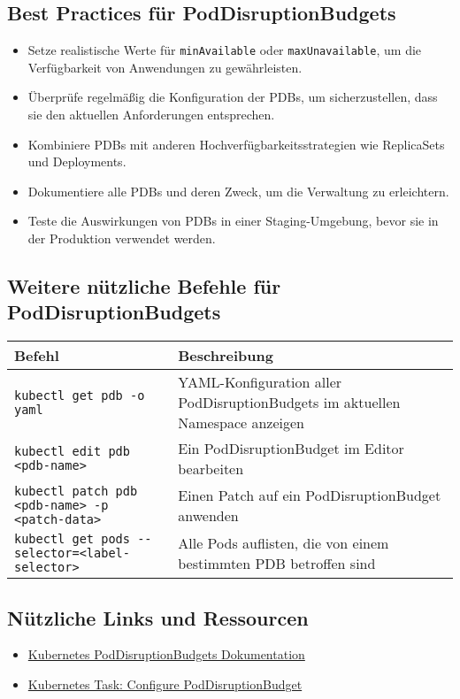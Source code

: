 \subsection{Best Practices für PodDisruptionBudgets}
\begin{itemize}
    \item Setze realistische Werte für \texttt{minAvailable} oder \texttt{maxUnavailable}, um die Verfügbarkeit von Anwendungen zu gewährleisten.
    \item Überprüfe regelmäßig die Konfiguration der PDBs, um sicherzustellen, dass sie den aktuellen Anforderungen entsprechen.
    \item Kombiniere PDBs mit anderen Hochverfügbarkeitsstrategien wie ReplicaSets und Deployments.
    \item Dokumentiere alle PDBs und deren Zweck, um die Verwaltung zu erleichtern.
    \item Teste die Auswirkungen von PDBs in einer Staging-Umgebung, bevor sie in der Produktion verwendet werden.
\end{itemize}

\subsection{Weitere nützliche Befehle für PodDisruptionBudgets}
\begin{tabular}{|p{}|p{}|}
\hline
\textbf{Befehl} & \textbf{Beschreibung} \\
\hline
\texttt{kubectl get pdb -o yaml} & YAML-Konfiguration aller PodDisruptionBudgets im aktuellen Namespace anzeigen \\
\texttt{kubectl edit pdb <pdb-name>} & Ein PodDisruptionBudget im Editor bearbeiten \\
\texttt{kubectl patch pdb <pdb-name> -p <patch-data>} & Einen Patch auf ein PodDisruptionBudget anwenden \\
\texttt{kubectl get pods {-}{-}selector=<label-selector>} & Alle Pods auflisten, die von einem bestimmten PDB betroffen sind \\
\hline
\end{tabular}

\subsection{Nützliche Links und Ressourcen}
\begin{itemize}
    \item \href{https://kubernetes.io/docs/concepts/workloads/pods/disruptions/}{Kubernetes PodDisruptionBudgets Dokumentation}
    \item \href{https://kubernetes.io/docs/tasks/run-application/configure-pdb/}{Kubernetes Task: Configure PodDisruptionBudget}
\end{itemize}